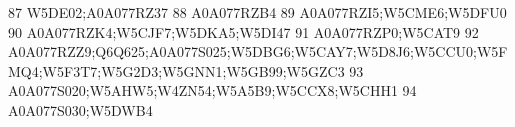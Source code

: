 \documentclass{beamer}
\begin{document}
\begin{frame}[fragile]
\begin{itemize}
\begin{Schunk}
\begin{Soutput}
87                                                                                                                                                                                                                                                                                                                                                              W5DE02;A0A077RZ37
88                                                                                                                                                                                                                                                                                                                                                                     A0A077RZB4
89                                                                                                                                                                                                                                                                                                                                                       A0A077RZI5;W5CME6;W5DFU0
90                                                                                                                                                                                                                                                                                                                                                A0A077RZK4;W5CJF7;W5DKA5;W5DI47
91                                                                                                                                                                                                                                                                                                                                                              A0A077RZP0;W5CAT9
92                                                                                                                                                                                                                                                                             A0A077RZZ9;Q6Q625;A0A077S025;W5DBG6;W5CAY7;W5D8J6;W5CCU0;W5FMQ4;W5F3T7;W5G2D3;W5GNN1;W5GB99;W5GZC3
93                                                                                                                                                                                                                                                                                                                                  A0A077S020;W5AHW5;W4ZN54;W5A5B9;W5CCX8;W5CHH1
94                                                                                                                                                                                                                                                                                                                                                              A0A077S030;W5DWB4

\end{Soutput}
\end{Schunk}
\end{itemize}
\end{frame}
\end{document}
